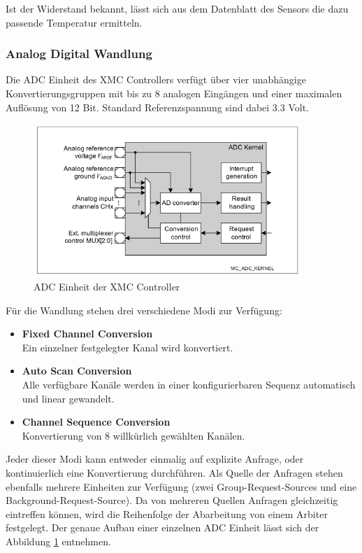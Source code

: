 Ist der Widerstand bekannt, lässt sich aus dem Datenblatt des Sensors die dazu passende Temperatur ermitteln.

\subsubsection{Analog Digital Wandlung}
Die ADC Einheit des XMC Controllers verfügt über vier unabhängige Konvertierungsgruppen mit bis zu 8 analogen Eingängen und einer maximalen Auflösung von 12 Bit. Standard Referenzspannung sind dabei 3.3 Volt.

\begin{figure}[h]
\centering
\includegraphics[width=0.9\textwidth]{sensor/xmc_adc.PNG}
\caption{ADC Einheit der XMC Controller}
\label{img:xmc_adc}
\end{figure}

Für die Wandlung stehen drei verschiedene Modi zur Verfügung: 
\begin{itemize}
\item \textbf{Fixed Channel Conversion} \\
Ein einzelner festgelegter Kanal wird konvertiert.
\item \textbf{Auto Scan Conversion} \\
Alle verfügbare Kanäle werden in einer konfigurierbaren Sequenz automatisch und linear gewandelt.
\item \textbf{Channel Sequence Conversion} \\
Konvertierung von 8 willkürlich gewählten Kanälen.
\end{itemize}

Jeder dieser Modi kann entweder einmalig auf explizite Anfrage, oder kontinuierlich eine Konvertierung durchführen. Als Quelle der Anfragen stehen ebenfalls mehrere Einheiten zur Verfügung (zwei Group-Request-Sources und eine Background-Request-Source). Da von mehreren Quellen Anfragen gleichzeitig eintreffen können, wird die Reihenfolge der Abarbeitung von einem Arbiter festgelegt. Der genaue Aufbau einer einzelnen ADC Einheit lässt sich der Abbildung \ref{img:xmc_adc} entnehmen. \\


